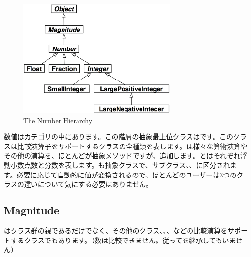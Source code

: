 \documentclass[a4paper,10pt,twoside]{book}
\begin{document}
\begin{figure}[ht]
\centerline {\includegraphics[width=8cm]{NumberHierarchy}}
\caption{The Number Hierarchy }
\end{figure}

数値はカテゴリの中にあります。この階層の抽象最上位クラスはです。このクラスは比較演算子をサポートするクラスの全種類を表します。は様々な算術演算やその他の演算を、ほとんどが抽象メソッドですが、追加します。とはそれぞれ浮動小数点数と分数を表します。も抽象クラスで、サブクラス、、に区分されます。必要に応じて自動的に値が変換されるので、ほとんどのユーザーは3つのクラスの違いについて気にする必要はありません。

\subsection{Magnitude}

はクラス群の親であるだけでなく、その他のクラス、、、などの比較演算をサポートするクラスでもあります。（数は比較できません。従ってを継承してもいません）
\end{document}
